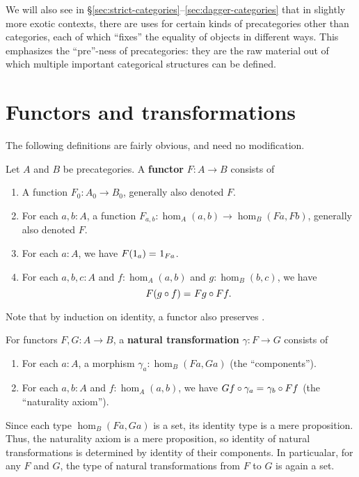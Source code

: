 We will also see in \S\ref{sec:strict-categories}--\ref{sec:dagger-categories} that in slightly more exotic contexts, there are uses for certain kinds of precategories other than categories, each of which ``fixes'' the equality of objects in different ways.
This emphasizes the ``pre''-ness of precategories: they are the raw material out of which multiple important categorical structures can be defined.


\section{Functors and transformations}
\label{sec:transfors}

The following definitions are fairly obvious, and need no modification.

\begin{defn}\label{ct:functor}
  Let $A$ and $B$ be precategories.
  A \textbf{functor} $F:A\to B$ consists of
  \begin{enumerate}
  \item A function $F_0:A_0\to B_0$, generally also denoted $F$.
  \item For each $a,b:A$, a function $F_{a,b}:\hom_A(a,b) \to \hom_B(Fa,Fb)$, generally also denoted $F$.
  \item For each $a:A$, we have $F(1_a) =_{} 1_{Fa}$.
  \item For each $a,b,c:A$ and $f:\hom_A(a,b)$ and $g:\hom_B(b,c)$, we have
    \[F(g\circ f) =_{} Fg\circ Ff.\]
  \end{enumerate}
\end{defn}

Note that by induction on identity, a functor also preserves \idtoiso.

\begin{defn}\label{ct:nattrans}
  For functors $F,G:A\to B$, a \textbf{natural transformation} $\gamma:F\to G$ consists of
  \begin{enumerate}
  \item For each $a:A$, a morphism $\gamma_a:\hom_B(Fa,Ga)$ (the ``components'').
  \item For each $a,b:A$ and $f:\hom_A(a,b)$, we have $Gf\circ \gamma_a =_{} \gamma_b\circ Ff$ (the ``naturality axiom'').
  \end{enumerate}
\end{defn}

Since each type $\hom_B(Fa,Ga)$ is a set, its identity type is a mere proposition.
Thus, the naturality axiom is a mere proposition, so identity of natural transformations is determined by identity of their components.
In particualar, for any $F$ and $G$, the type of natural transformations from $F$ to $G$ is again a set.

